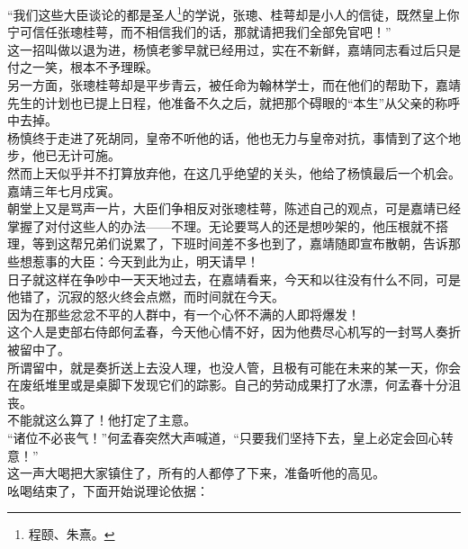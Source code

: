 \begin{multicols}{\theparacolNo}
“我们这些大臣谈论的都是圣人\footnote{程颐、朱熹。}的学说，张璁、桂萼却是小人的信徒，既然皇上你宁可信任张璁桂萼，而不相信我们的话，那就请把我们全部免官吧！”\\

这一招叫做以退为进，杨慎老爹早就已经用过，实在不新鲜，嘉靖同志看过后只是付之一笑，根本不予理睬。\\

另一方面，张璁桂萼却是平步青云，被任命为翰林学士，而在他们的帮助下，嘉靖先生的计划也已提上日程，他准备不久之后，就把那个碍眼的“本生”从父亲的称呼中去掉。\\

杨慎终于走进了死胡同，皇帝不听他的话，他也无力与皇帝对抗，事情到了这个地步，他已无计可施。\\

然而上天似乎并不打算放弃他，在这几乎绝望的关头，他给了杨慎最后一个机会。\\

嘉靖三年七月戍寅。\\

朝堂上又是骂声一片，大臣们争相反对张璁桂萼，陈述自己的观点，可是嘉靖已经掌握了对付这些人的办法——不理。无论要骂人的还是想吵架的，他压根就不搭理，等到这帮兄弟们说累了，下班时间差不多也到了，嘉靖随即宣布散朝，告诉那些想惹事的大臣：今天到此为止，明天请早！\\

日子就这样在争吵中一天天地过去，在嘉靖看来，今天和以往没有什么不同，可是他错了，沉寂的怒火终会点燃，而时间就在今天。\\

因为在那些忿忿不平的人群中，有一个心怀不满的人即将爆发！\\

这个人是吏部右侍郎何孟春，今天他心情不好，因为他费尽心机写的一封骂人奏折被留中了。\\

所谓留中，就是奏折送上去没人理，也没人管，且极有可能在未来的某一天，你会在废纸堆里或是桌脚下发现它们的踪影。自己的劳动成果打了水漂，何孟春十分沮丧。\\

不能就这么算了！他打定了主意。\\

“诸位不必丧气！”何孟春突然大声喊道，“只要我们坚持下去，皇上必定会回心转意！”\\

这一声大喝把大家镇住了，所有的人都停了下来，准备听他的高见。\\

吆喝结束了，下面开始说理论依据：\\


\end{multicols}
